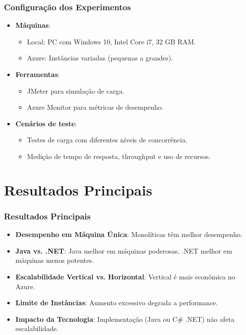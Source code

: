 \documentclass{beamer}
\begin{document}
\begin{frame}
\frametitle{Configuração dos Experimentos}
\begin{itemize}
    \item \textbf{Máquinas}:
    \begin{itemize}
        \item Local: PC com Windows 10, Intel Core i7, 32 GB RAM.
        \item Azure: Instâncias variadas (pequenas a grandes).
    \end{itemize}
    \item \textbf{Ferramentas}:
    \begin{itemize}
        \item JMeter para simulação de carga.
        \item Azure Monitor para métricas de desempenho.
    \end{itemize}
    \item \textbf{Cenários de teste}:
    \begin{itemize}
        \item Testes de carga com diferentes níveis de concorrência.
        \item Medição de tempo de resposta, throughput e uso de recursos.
    \end{itemize}
\end{itemize}
\end{frame}

\section{Resultados Principais}

\begin{frame}
\frametitle{Resultados Principais}
\begin{itemize}
    \item \textbf{Desempenho em Máquina Única}: Monolíticas têm melhor desempenho.
    \item \textbf{Java vs. .NET}: Java melhor em máquinas poderosas, .NET melhor em máquinas menos potentes.
    \item \textbf{Escalabilidade Vertical vs. Horizontal}: Vertical é mais econômica no Azure.
    \item \textbf{Limite de Instâncias}: Aumento excessivo degrada a performance.
    \item \textbf{Impacto da Tecnologia}: Implementação (Java ou C\# .NET) não afeta escalabilidade.
\end{itemize}
\end{frame}
\end{document}
